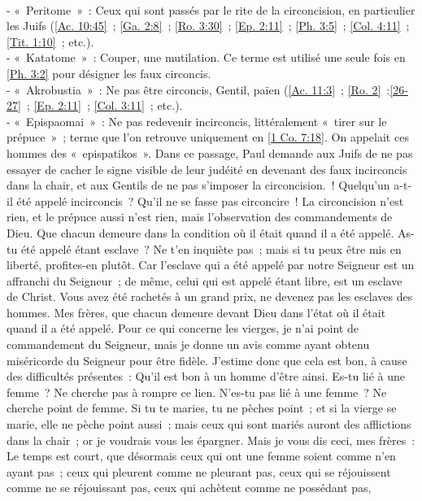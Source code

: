 \begin{multicols}{2}
{\\- «~Peritome~»~: Ceux qui sont passés par le rite de la circoncision, en particulier les Juifs (\vref{Ac. 10:45}~; \vref{Ga. 2:8}~; \vref{Ro. 3:30}~; \vref{Ep. 2:11}~; \vref{Ph. 3:5}~; \vref{Col. 4:11}~; \vref{Tit. 1:10}~; etc.).
\\- «~Katatome~»~: Couper, une mutilation. Ce terme est utilisé une seule fois en \vref{Ph. 3:2} pour désigner les faux circoncis. 
\\- «~Akrobustia~»~: Ne pas être circoncis, Gentil, païen (\vref{Ac. 11:3}~; \vref{Ro. 2}~:\vref{26-27}~; \vref{Ep. 2:11}~; \vref{Col. 3:11}~; etc.). 
\\- «~Epispaomai~»~: Ne pas redevenir incirconcis, littéralement «~tirer sur le prépuce~»~; terme que l'on retrouve uniquement en \vref{1 Co. 7:18}. On appelait ces hommes des «~epispatikos~». Dans ce passage, Paul demande aux Juifs de ne pas essayer de cacher le signe visible de leur judéité en devenant des faux incirconcis dans la chair, et aux Gentils de ne pas s'imposer la circoncision.}~! Quelqu'un a-t-il été appelé incirconcis~? Qu'il ne se fasse pas circoncire~!
La circoncision n'est rien, et le prépuce aussi n'est rien, mais l'observation des commandements de Dieu.
Que chacun demeure dans la condition où il était quand il a été appelé.
As-tu été appelé étant esclave~? Ne t'en inquiète pas~; mais si tu peux être mis en liberté, profites-en plutôt.
Car l'esclave qui a été appelé par notre Seigneur est un affranchi du Seigneur~; de même, celui qui est appelé étant libre, est un esclave de Christ.
Vous avez été rachetés à un grand prix, ne devenez pas les esclaves des hommes.
Mes frères, que chacun demeure devant Dieu dans l'état où il était quand il a été appelé.
Pour ce qui concerne les vierges, je n'ai point de commandement du Seigneur, mais je donne un avis comme ayant obtenu miséricorde du Seigneur pour être fidèle.
J'estime donc que cela est bon, à cause des difficultés présentes~: Qu'il est bon à un homme d'être ainsi.
Es-tu lié à une femme~? Ne cherche pas à rompre ce lien. N'es-tu pas lié à une femme~? Ne cherche point de femme.
Si tu te maries, tu ne pèches point~; et si la vierge se marie, elle ne pèche point aussi~; mais ceux qui sont mariés auront des afflictions dans la chair~; or je voudrais vous les épargner.
Mais je vous dis ceci, mes frères~: Le temps est court, que désormais ceux qui ont une femme soient comme n'en ayant pas~;
ceux qui pleurent comme ne pleurant pas, ceux qui se réjouissent comme ne se réjouissant pas, ceux qui achètent comme ne possédant pas,

\end{multicols}
